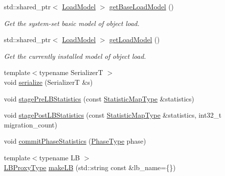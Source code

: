 \begin{DoxyCompactItemize}
std\+::shared\+\_\+ptr$<$ \hyperlink{structvt_1_1vrt_1_1collection_1_1balance_1_1_load_model}{Load\+Model} $>$ \hyperlink{structvt_1_1vrt_1_1collection_1_1balance_1_1_l_b_manager_a9822187c2745a7b3b9c4a5929f8e3cc4}{get\+Base\+Load\+Model} ()
\begin{DoxyCompactList}\small\item\em Get the system-\/set basic model of object load. \end{DoxyCompactList}\item 
std\+::shared\+\_\+ptr$<$ \hyperlink{structvt_1_1vrt_1_1collection_1_1balance_1_1_load_model}{Load\+Model} $>$ \hyperlink{structvt_1_1vrt_1_1collection_1_1balance_1_1_l_b_manager_aaa442ee117e8c9c978c77275cb3e6404}{get\+Load\+Model} ()
\begin{DoxyCompactList}\small\item\em Get the currently installed model of object load. \end{DoxyCompactList}\item 
{\footnotesize template$<$typename SerializerT $>$ }\\void \hyperlink{structvt_1_1vrt_1_1collection_1_1balance_1_1_l_b_manager_a99b59530c0557d779760394e9ff2557f}{serialize} (SerializerT \&s)
\item 
void \hyperlink{structvt_1_1vrt_1_1collection_1_1balance_1_1_l_b_manager_a252f9c83adfffa64bbad75c4bf89fce3}{stage\+Pre\+L\+B\+Statistics} (const \hyperlink{structvt_1_1vrt_1_1collection_1_1balance_1_1_l_b_manager_a3c6941b9c14a77e015047c659b817a85}{Statistic\+Map\+Type} \&statistics)
\item 
void \hyperlink{structvt_1_1vrt_1_1collection_1_1balance_1_1_l_b_manager_af60abfbc4e60ea0628f9e08eea7442f5}{stage\+Post\+L\+B\+Statistics} (const \hyperlink{structvt_1_1vrt_1_1collection_1_1balance_1_1_l_b_manager_a3c6941b9c14a77e015047c659b817a85}{Statistic\+Map\+Type} \&statistics, int32\+\_\+t migration\+\_\+count)
\item 
void \hyperlink{structvt_1_1vrt_1_1collection_1_1balance_1_1_l_b_manager_a151c019b8a964e0a13e5c49a568958e3}{commit\+Phase\+Statistics} (\hyperlink{namespacevt_a46ce6733d5cdbd735d561b7b4029f6d7}{Phase\+Type} phase)
\item 
{\footnotesize template$<$typename LB $>$ }\\\hyperlink{structvt_1_1vrt_1_1collection_1_1balance_1_1_l_b_manager_a8b1a7735366beb85c2c2ccc3912cdd80}{L\+B\+Proxy\+Type} \hyperlink{structvt_1_1vrt_1_1collection_1_1balance_1_1_l_b_manager_ababc0a22632d22eb8619bb6fd2b53dd4}{make\+LB} (std\+::string const \&lb\+\_\+name=\{\})

\end{DoxyCompactItemize}
